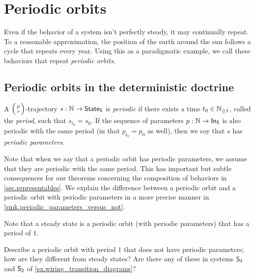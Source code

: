 \documentclass[DynamicalBook]{subfiles}
\begin{document}
\section{Periodic orbits}\label{sec.periodic_orbit_discrete}

Even if the behavior of a system isn't perfectly steady, it may continually
repeat. To a reasonable approximation, the position of the earth around the sun
follows a cycle that repeats every year. Using this as a paradigmatic example,
we call these behaviors that repeat \emph{periodic orbits}.

\subsection{Periodic orbits in the deterministic doctrine}

\begin{definition} \label{def.periodic_orbit_discrete}
  A $\lens{p}{v}$-trajectory $s : \mathbb{N} \to \mathsf{State}_{\mathsf{S}}$ is \emph{periodic} if there
  exists a time $t_0 \in \mathbb{N}_{\geq1}$, called the \emph{period}, such that $s_{t_0} = s_0$. If the sequence of
  parameters $p : \mathbb{N} \to \mathsf{In}_{\mathsf{S}}$ is also periodic with the same period (in that $p_{t_0} = p_0$ as well), then we say that $s$ has \emph{periodic parameters}.
  

\end{definition}

\begin{remark}
  Note that when we say that a periodic orbit has periodic parameters, we assume
  that they are periodic with the same period. This has important but subtle
  consequences for our theorems concerning the composition of behaviors in
  \cref{sec.representables}. We explain the difference between a periodic orbit
  and a periodic orbit with periodic parameters in a more precise manner
  in \cref{rmk.periodic_parameters_versus_not}.
\end{remark}

\begin{remark}
  Note that a steady state is a periodic orbit (with periodic parameters) that has
  a period of $1$. 
\end{remark}

\begin{exercise}
Describe a periodic orbit with period $1$ that does not have periodic
parameters; how are they different from steady states? Are there any of these in systems $\mathsf{S_1}$ and $\mathsf{S_2}$ of \cref{ex.wiring_transition_diagrams}?
\end{exercise}
\end{document}
